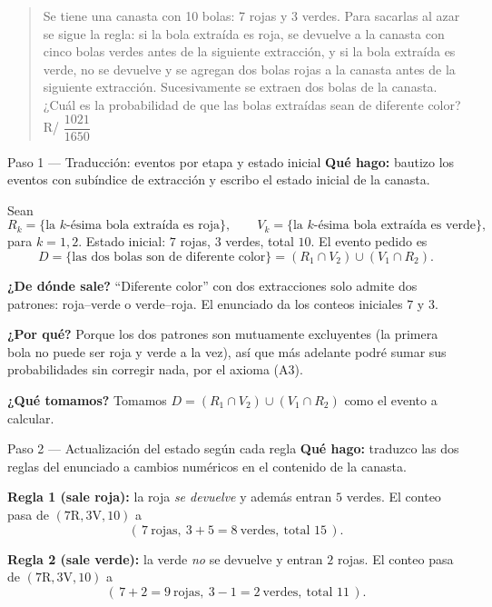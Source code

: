 \documentclass[11pt]{article}
\begin{document}
\begin{quote}
Se tiene una canasta con 10 bolas: 7 rojas y 3 verdes. Para sacarlas al azar se sigue la regla: si la bola extra\'ida es roja, se devuelve a la canasta con cinco bolas verdes antes de la siguiente extracci\'on, y si la bola extra\'ida es verde, no se devuelve y se agregan dos bolas rojas a la canasta antes de la siguiente extracci\'on. Sucesivamente se extraen dos bolas de la canasta. ¿Cu\'al es la probabilidad de que las bolas extra\'idas sean de diferente color? \hfill R/ $\dfrac{1021}{1650}$
\end{quote}

\begin{sol}

\begin{paso}{Paso 1 --- Traducci\'on: eventos por etapa y estado inicial}
\textbf{Qu\'e hago:} bautizo los eventos con sub\'indice de extracci\'on y escribo el estado inicial de la canasta.

Sean
\[
R_k=\{\text{la } k\text{-\'esima bola extra\'ida es roja}\},
\qquad
V_k=\{\text{la } k\text{-\'esima bola extra\'ida es verde}\},
\]
para $k=1,2$. Estado inicial: $7$ rojas, $3$ verdes, total $10$. El evento pedido es
\[
D=\{\text{las dos bolas son de diferente color}\}=(R_1\cap V_2)\cup(V_1\cap R_2).
\]

\textbf{¿De d\'onde sale?} ``Diferente color'' con dos extracciones solo admite dos patrones: roja--verde o verde--roja. El enunciado da los conteos iniciales $7$ y $3$.

\textbf{¿Por qu\'e?} Porque los dos patrones son mutuamente excluyentes (la primera bola no puede ser roja y verde a la vez), as\'i que m\'as adelante podr\'e sumar sus probabilidades sin corregir nada, por el axioma (A3).

\textbf{¿Qu\'e tomamos?} Tomamos $D=(R_1\cap V_2)\cup(V_1\cap R_2)$ como el evento a calcular.
\end{paso}

\begin{paso}{Paso 2 --- Actualizaci\'on del estado seg\'un cada regla}
\textbf{Qu\'e hago:} traduzco las dos reglas del enunciado a cambios num\'ericos en el contenido de la canasta.

\textbf{Regla 1 (sale roja):} la roja \emph{se devuelve} y adem\'as entran $5$ verdes. El conteo pasa de $(7\text{R},3\text{V},10)$ a
\[
(\,7\ \text{rojas},\ 3+5=8\ \text{verdes},\ \text{total } 15\,).
\]

\textbf{Regla 2 (sale verde):} la verde \emph{no} se devuelve y entran $2$ rojas. El conteo pasa de $(7\text{R},3\text{V},10)$ a
\[
(\,7+2=9\ \text{rojas},\ 3-1=2\ \text{verdes},\ \text{total } 11\,).
\]


\end{paso}
\end{sol}
\end{document}
